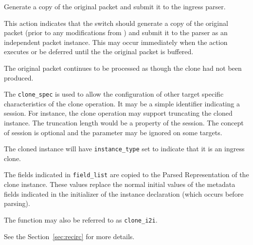 \documentclass[12pt]{article}
\begin{document}

{ %
Generate a copy of the original packet and submit it to the ingress parser.
}
{ %
}
{ %
This action indicates that the switch should generate a copy of the original 
packet (prior to any modifications from \matchaction) and submit it to the 
parser as an independent packet instance.  This may occur immediately when 
the action executes or be deferred until the the original packet is buffered. 
 

The original packet continues to be processed as though the clone had not 
been produced.

The \texttt{clone_spec} is used to allow the configuration of other target specific 
characteristics of the clone operation. It may be a simple identifier indicating 
a session. For instance, the clone operation may support truncating the cloned 
instance. The truncation length would be a property of the session. The concept 
of session is optional and the parameter may be ignored on some targets.

The cloned instance will have \texttt{instance_type} set to indicate that it is an 
ingress clone. 

The fields indicated in \texttt{field_list} are copied to the Parsed Representation 
of the clone instance. These values replace the normal initial values of the 
metadata fields indicated in the initializer of the instance declaration (which 
occurs before parsing).

The function may also be referred to as \texttt{clone_i2i}.

See the Section~\ref{sec:recirc} for more details.
}

\end{document}
